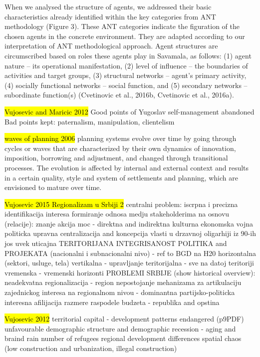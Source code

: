 \documentclass[11pt]{report}
\begin{document}
When we analysed the structure of agents, we addressed their basic characteristics already identified within the key categories from ANT methodology (Figure 3). These ANT categories indicate the figuration of the chosen agents in the concrete environment. They are adapted according to our interpretation of ANT methodological approach. Agent structures are circumscribed based on roles these agents play in Savamala, as follows: (1) agent nature – its operational manifestation, (2) level of influence – the boundaries of activities and target groups, (3) structural networks – agent’s primary activity, (4) socially functional networks – social function, and (5) secondary networks – subordinate function(s) (Cvetinovic et al., 2016b, Cvetinovic et al., 2016a).

\hl{Vujosevic and Maricic 2012}
Good points of Yugoslav self-management abandoned
Bad points kept: paternalism, manipulation, clientelism

 	\hl{waves of planning 2006}
planning systems evolve over time by going through cycles or waves that are characterized  by  their  own  dynamics  of  innovation,  imposition,  borrowing  and  adjustment,  and changed through transitional processes. The evolution is affected by internal and external context and results in a certain quality, style and system of settlements and planning, which
are envisioned to mature over time.

\hl{Vujosevic 2015 Regionalizam u Srbiji 2}
centralni problem: iscrpna i precizna identifikacija interesa
formiranje odnosa medju stakeholderima na osnovu (relacije):
    znanje
    akcija
    moc - direktna and indirektna
        kulturna
        ekonomska
        vojna
        politicka
upravna centralizacija and koncepcija vlasti u drzavnoj oligarhiji iz 90-ih jos uvek uticajna
TERITORIJANA INTEGRISANOST POLITIKA and PROJEKATA (nacionalni i subnacionalni nivo) - ref to BGD na H20
    horizontalna (sektori, usluge, tela)
    vertikalna - upravljanje
    teritorijalna - sve na datoj teritoriji
    vremenska - vremenski horizonti
PROBLEMI SRBIJE (show historical overview):
    neadekvatna regionalizacija  - region
    nepostojanje mehanizama za artikulaciju zajednickog interesa na regionalnom nivou - dominantna partijsko-politicka interesna afilijacija
    razmere raspodele budzeta - republika and opstina

\hl{Vujosevic 2012}
territorial capital - development patterns endangered  (p9PDF)
    unfavourable demographic structure and demographic recession - aging and braind rain
    number of refugees
    regional development differences
    spatial chaos (low construction and urbanization, illegal construction)
    
\end{document}
